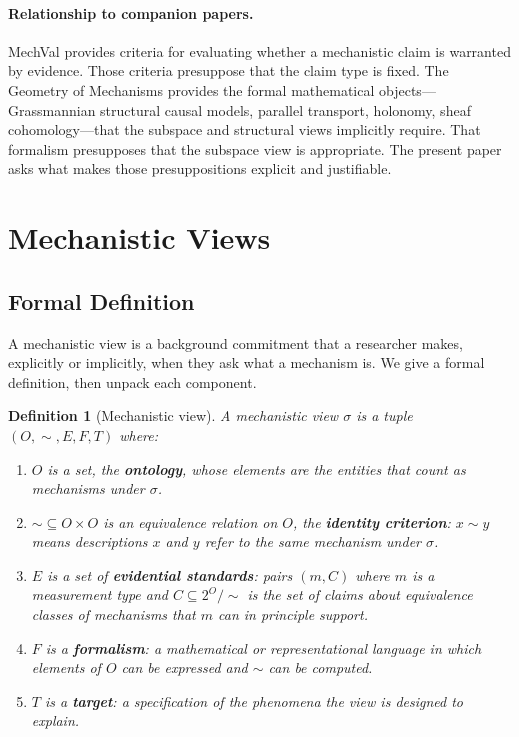 \documentclass[11pt]{article}
\newtheorem{definition}{Definition}[section]
\theoremstyle{remark}
\newcommand{\view}{\sigma}
\begin{document}
\paragraph{Relationship to companion papers.}
MechVal \citep{tower2026mechval} provides criteria for evaluating
whether a mechanistic claim is warranted by evidence.  Those criteria
presuppose that the claim type is fixed.  The Geometry of Mechanisms
\citep{tower2026geom} provides the formal mathematical objects---Grassmannian
structural causal models, parallel transport, holonomy, sheaf
cohomology---that the subspace and structural views implicitly require.
That formalism presupposes that the subspace view is appropriate.  The
present paper asks what makes those presuppositions explicit and
justifiable.

\section{Mechanistic Views}\label{sec:views}

\subsection{Formal Definition}

A mechanistic view is a background commitment that a researcher makes,
explicitly or implicitly, when they ask what a mechanism is.  We give
a formal definition, then unpack each component.

\begin{definition}[Mechanistic view]\label{def:view}
A \emph{mechanistic view} $\view$ is a tuple $(O, {\sim}, E, F, T)$
where:
\begin{enumerate}[leftmargin=*, label=(\roman*)]
\item $O$ is a set, the \textbf{ontology}, whose elements are the
      entities that count as mechanisms under $\view$.
\item ${\sim} \subseteq O \times O$ is an equivalence relation on $O$,
      the \textbf{identity criterion}: $x \sim y$ means descriptions $x$
      and $y$ refer to the same mechanism under $\view$.
\item $E$ is a set of \textbf{evidential standards}: pairs
      $(m, C)$ where $m$ is a measurement type and $C \subseteq
      2^O/{\sim}$ is the set of claims about equivalence classes of
      mechanisms that $m$ can in principle support.
\item $F$ is a \textbf{formalism}: a mathematical or representational
      language in which elements of $O$ can be expressed and $\sim$ can
      be computed.
\item $T$ is a \textbf{target}: a specification of the phenomena the
      view is designed to explain.
\end{enumerate}
\end{definition}
\end{document}
